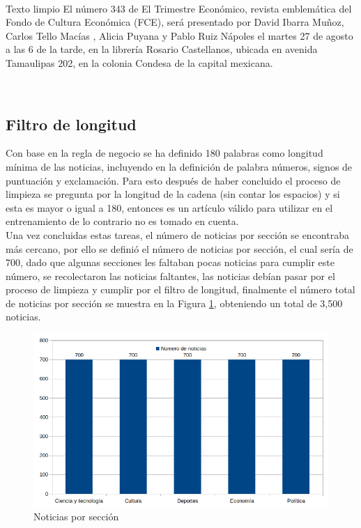 \ \\

\begin{mygraybox}[label={box:cp5:limpio}]{Texto limpio} 
El número 343 de El Trimestre Económico, revista emblemática del Fondo de Cultura 
Económica (FCE), será presentado por David Ibarra Muñoz, Carlos Tello Macías , Alicia Puyana y Pablo Ruiz Nápoles el martes 27 de agosto a las 6 de la tarde, en la librería Rosario Castellanos, ubicada en avenida Tamaulipas 202, en la colonia Condesa de la capital mexicana.
\end{mygraybox}
\ \\

\subsection{Filtro de longitud}

Con base en la regla de negocio  se ha definido 180 palabras como longitud mínima de las noticias, incluyendo en la definición de palabra números, signos de puntuación y exclamación.
Para esto después de haber concluido el proceso de limpieza se pregunta por la longitud de la cadena (sin contar los espacios) y si esta es mayor o igual a 180, entonces es un artículo válido para utilizar en el entrenamiento de lo contrario no es tomado en cuenta.\\

Una vez concluidas estas tareas, el número de noticias por sección se encontraba más cercano, por ello se definió el número de noticias por sección, el cual sería de 700, dado que algunas secciones les faltaban pocas noticias para cumplir este número, se recolectaron las noticias faltantes, las noticias debían pasar por el proceso de limpieza y cumplir por el filtro de longitud, finalmente el número total de noticias por sección se muestra en la Figura \ref{fig:notBalanceadas}, obteniendo un total de 3,500 noticias.\\

\begin{figure}[H]
	\centering
	\includegraphics[scale=.45]{imagenes/Capitulo5/noticiasBalanceadas.png}
	\caption{Noticias por sección}
	\label{fig:notBalanceadas}
\end{figure}